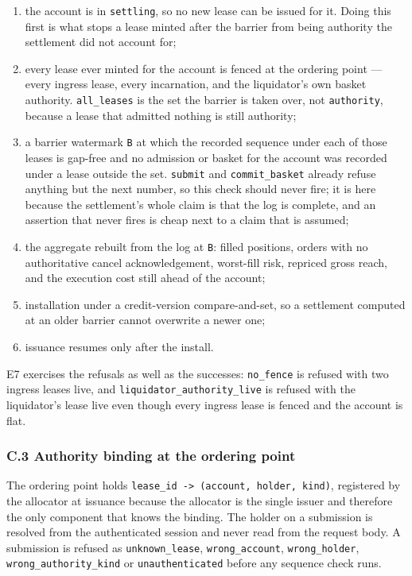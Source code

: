 \documentclass[10pt,a4paper]{article}
\providecommand{\tightlist}{\setlength{\itemsep}{0pt}\setlength{\parskip}{0pt}}
\begin{document}
\begin{enumerate}
\def\labelenumi{\arabic{enumi}.}
\tightlist
\item
  the account is in \texttt{settling}, so no new lease can be issued for it. Doing this
  first is what stops a lease minted after the barrier from being authority the
  settlement did not account for;
\item
  every lease ever minted for the account is fenced at the ordering point ---
  every ingress lease, every incarnation, and the liquidator's own basket
  authority. \texttt{all\_leases} is the set the barrier is taken over, not
  \texttt{authority}, because a lease that admitted nothing is still authority;
\item
  a barrier watermark \texttt{B} at which the recorded sequence under each of those
  leases is gap-free and no admission or basket for the account was recorded
  under a lease outside the set. \texttt{submit} and \texttt{commit\_basket} already refuse
  anything but the next number, so this check should never fire; it is here
  because the settlement's whole claim is that the log is complete, and an
  assertion that never fires is cheap next to a claim that is assumed;
\item
  the aggregate rebuilt from the log at \texttt{B}: filled positions, orders with no
  authoritative cancel acknowledgement, worst-fill risk, repriced gross reach,
  and the execution cost still ahead of the account;
\item
  installation under a credit-version compare-and-set, so a settlement computed
  at an older barrier cannot overwrite a newer one;
\item
  issuance resumes only after the install.
\end{enumerate}

E7 exercises the refusals as well as the successes: \texttt{no\_fence} is refused with
two ingress leases live, and \texttt{liquidator\_authority\_live} is refused with the
liquidator's lease live even though every ingress lease is fenced and the
account is flat.

\subsubsection{C.3 Authority binding at the ordering point}\label{c.3-authority-binding-at-the-ordering-point}

The ordering point holds \texttt{lease\_id\ -\textgreater{}\ (account,\ holder,\ kind)}, registered by the
allocator at issuance because the allocator is the single issuer and therefore
the only component that knows the binding. The holder on a submission is resolved
from the authenticated session and never read from the request body. A submission
is refused as \texttt{unknown\_lease}, \texttt{wrong\_account}, \texttt{wrong\_holder},
\texttt{wrong\_authority\_kind} or \texttt{unauthenticated} before any sequence check runs.
\end{document}
